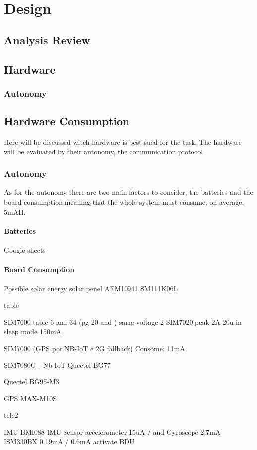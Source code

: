 
\chapter{Design}
\section{Analysis Review}

\section{Hardware}
\subsection{Autonomy}


\section{Hardware Consumption}
Here will be discussed witch hardware is best sued for the task. The hardware will be evaluated by their
autonomy, the communication protocol
\subsection{Autonomy}
As for the autonomy there are two main factors to consider, the batteries and the board consumption
meaning that the whole system must consume, on average, 5mAH.
\subsubsection{Batteries}
Google sheets
\subsubsection{Board Consumption}

Possible solar energy
solar penel
AEM10941
SM111K06L

table

SIM7600 
table 6 and 34 (pg 20 and ) same voltage
2
SIM7020
peak 2A 20u in sleep mode 150mA

SIM7000 (GPS por NB-IoT e 2G fallback)
Consome: 11mA

SIM7080G - Nb-IoT
Quectel BG77

Quectel BG95-M3

 
GPS
MAX-M10S

tele2

IMU
BMI088 IMU Sensor
accelerometer 15uA  / and Gyroscope 2.7mA
ISM330BX
0.19mA / 0.6mA
activate BDU

